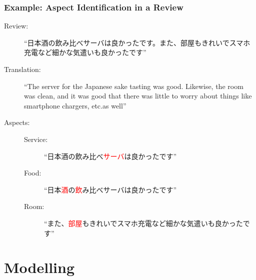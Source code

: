 \documentclass[11pt]{beamer}
\begin{document}
	\begin{frame}
		\frametitle{Example: Aspect Identification in a Review}
		\begin{description}
			\item[Review:] ``日本酒の飲み比べサーバは良かったです。また、部屋もきれいでスマホ充電など細かな気遣いも良かったです''
			\pause
			\item[Translation:] ``The server for the Japanese sake tasting was good. Likewise, the room was clean, and it was good that there was little to worry about things like smartphone chargers, etc.\@ as well''
			\pause
			\item[Aspects:] 
			\begin{description}
				\item[Service:] ``日本酒の飲み比べ\textcolor{red}{サーバ}は良かったです''
				\item[Food:] ``日本\textcolor{red}{酒}の\textcolor{red}{飲}み比べサーバは良かったです''
				\item[Room:] ``また、\textcolor{red}{部屋}もきれいでスマホ充電など細かな気遣いも良かったです''
			\end{description}
		\end{description}
	\end{frame}
	
	\section{Modelling}
	
\end{document}
